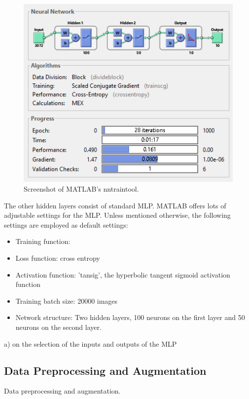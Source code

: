 \begin{figure}[h!]
  	\centering
  	\includegraphics{images/NNtool}
  	\caption{Screenshot of MATLAB's nntraintool.}
  	\label{fig:NNtool}
\end{figure}

The other hidden layers consist of standard MLP. MATLAB offers lots of adjustable settings for the MLP. Unless mentioned otherwise, the following settings are employed as default settings:

\begin{itemize}
	\item Training function: 
	
	\item Loss function: cross entropy
	
	\item Activation function: 'tansig', the hyperbolic tangent sigmoid activation function 
	
	\item Training batch size: 20000 images
	
	\item Network structure: Two hidden layers, 100 neurons on the first layer and 50 neurons on the second layer.
\end{itemize}

a) on the selection of the inputs and outputs of the MLP

\FloatBarrier
\subsection{Data Preprocessing and Augmentation}\label{subsec:preProp}
Data preprocessing and augmentation.

